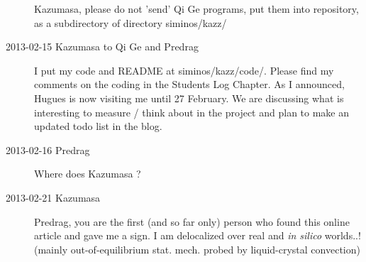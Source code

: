 \begin{description}
Kazumasa, please do not 'send' Qi Ge programs, put them into
repository, as a subdirectory of directory siminos/kazz/

\item[2013-02-15 Kazumasa to Qi Ge and Predrag]
I put my code and README at siminos/kazz/code/.
Please find my comments on the coding in the Students Log Chapter.
As I announced, Hugues is now visiting me until 27 February.
We are discussing what is interesting to measure / think about in the project
 and plan to make an updated todo list in the blog.

\item[2013-02-16 Predrag]
Where does Kazumasa
?

\item[2013-02-21 Kazumasa]
Predrag, you are the first (and so far only) person who found this
online article and gave me a sign. I am delocalized over real and
\textit{in silico} worlds..! (mainly out-of-equilibrium stat. mech.
probed by liquid-crystal convection)


\end{description}

\renewcommand{\ssp}{a}
